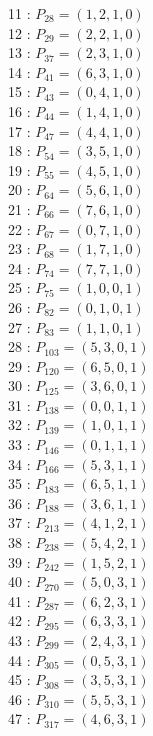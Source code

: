 \documentclass{article}
\begin{document}
{\begin{multicols}{3}
11 : $P_{28}=( 1, 2, 1, 0 )$\\
12 : $P_{29}=( 2, 2, 1, 0 )$\\
13 : $P_{37}=( 2, 3, 1, 0 )$\\
14 : $P_{41}=( 6, 3, 1, 0 )$\\
15 : $P_{43}=( 0, 4, 1, 0 )$\\
16 : $P_{44}=( 1, 4, 1, 0 )$\\
17 : $P_{47}=( 4, 4, 1, 0 )$\\
18 : $P_{54}=( 3, 5, 1, 0 )$\\
19 : $P_{55}=( 4, 5, 1, 0 )$\\
20 : $P_{64}=( 5, 6, 1, 0 )$\\
21 : $P_{66}=( 7, 6, 1, 0 )$\\
22 : $P_{67}=( 0, 7, 1, 0 )$\\
23 : $P_{68}=( 1, 7, 1, 0 )$\\
24 : $P_{74}=( 7, 7, 1, 0 )$\\
25 : $P_{75}=( 1, 0, 0, 1 )$\\
26 : $P_{82}=( 0, 1, 0, 1 )$\\
27 : $P_{83}=( 1, 1, 0, 1 )$\\
28 : $P_{103}=( 5, 3, 0, 1 )$\\
29 : $P_{120}=( 6, 5, 0, 1 )$\\
30 : $P_{125}=( 3, 6, 0, 1 )$\\
31 : $P_{138}=( 0, 0, 1, 1 )$\\
32 : $P_{139}=( 1, 0, 1, 1 )$\\
33 : $P_{146}=( 0, 1, 1, 1 )$\\
34 : $P_{166}=( 5, 3, 1, 1 )$\\
35 : $P_{183}=( 6, 5, 1, 1 )$\\
36 : $P_{188}=( 3, 6, 1, 1 )$\\
37 : $P_{213}=( 4, 1, 2, 1 )$\\
38 : $P_{238}=( 5, 4, 2, 1 )$\\
39 : $P_{242}=( 1, 5, 2, 1 )$\\
40 : $P_{270}=( 5, 0, 3, 1 )$\\
41 : $P_{287}=( 6, 2, 3, 1 )$\\
42 : $P_{295}=( 6, 3, 3, 1 )$\\
43 : $P_{299}=( 2, 4, 3, 1 )$\\
44 : $P_{305}=( 0, 5, 3, 1 )$\\
45 : $P_{308}=( 3, 5, 3, 1 )$\\
46 : $P_{310}=( 5, 5, 3, 1 )$\\
47 : $P_{317}=( 4, 6, 3, 1 )$\\

\end{multicols}}
\end{document}
